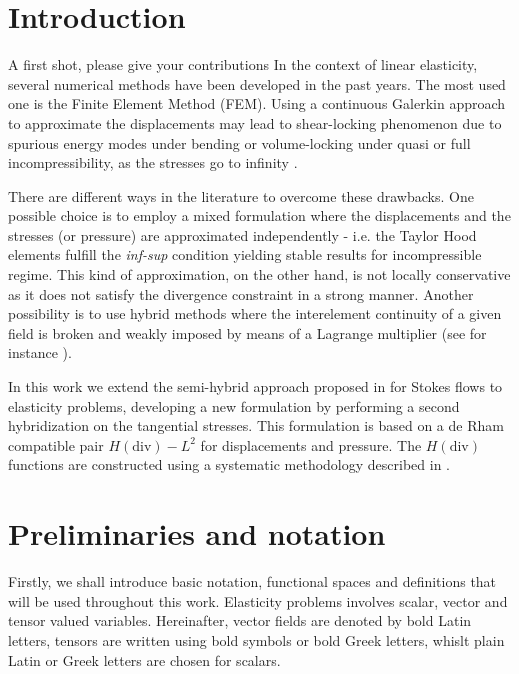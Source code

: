 \documentclass[english,11pt,3p,number,sort&compress]{elsarticle}
\newcommand{\giovane}{\color{red}{\bf\Large GA} \color{cyan} }
\begin{document}
\section{Introduction}

{\giovane A first shot, please give your contributions}
In the context of linear elasticity, several numerical methods have been developed in the past years. The most used one is the Finite Element Method (FEM). Using a continuous Galerkin approach to approximate the displacements may lead to shear-locking phenomenon due to spurious energy modes under bending \cite{bletzinger2000unified,belytschko1985stress} or volume-locking under quasi or full incompressibility, as the stresses go to infinity \cite{neto2005f,cervera2003mixed}.

There are different ways in the literature to overcome these drawbacks. One possible choice is to employ a mixed formulation \cite{brezzi2012mixed,arnold1988new} where the displacements and the stresses (or pressure) are approximated independently - i.e. the Taylor Hood elements \cite{taylor1973numerical} fulfill the \textit{inf-sup} condition yielding stable results for incompressible regime. This kind of approximation, on the other hand, is not locally conservative as it does not satisfy the divergence constraint in a strong manner. Another possibility is to use hybrid methods where the interelement continuity of a given field is broken and weakly imposed by means of a Lagrange multiplier (see for instance \cite{raviart1977primal,harder2016hybrid,farhloul1997dual}).

In this work we extend the semi-hybrid approach proposed in \cite{carvalho2024semi} for Stokes flows to elasticity problems, developing a new formulation by performing a second hybridization on the tangential stresses. This formulation is based on a de Rham compatible pair $H(\text{div})-L^2$ for displacements and pressure. The $H(\text{div})$ functions are constructed using a systematic methodology described in \cite{devloo2022efficient,de2013new}.

\section{Preliminaries and notation}

Firstly, we shall introduce basic notation, functional spaces and definitions that will be used throughout this work. Elasticity problems involves scalar, vector and tensor valued variables. Hereinafter, vector fields are denoted by bold Latin letters, tensors are written using bold symbols or bold Greek letters, whislt plain Latin or Greek letters are chosen for scalars.
\end{document}
